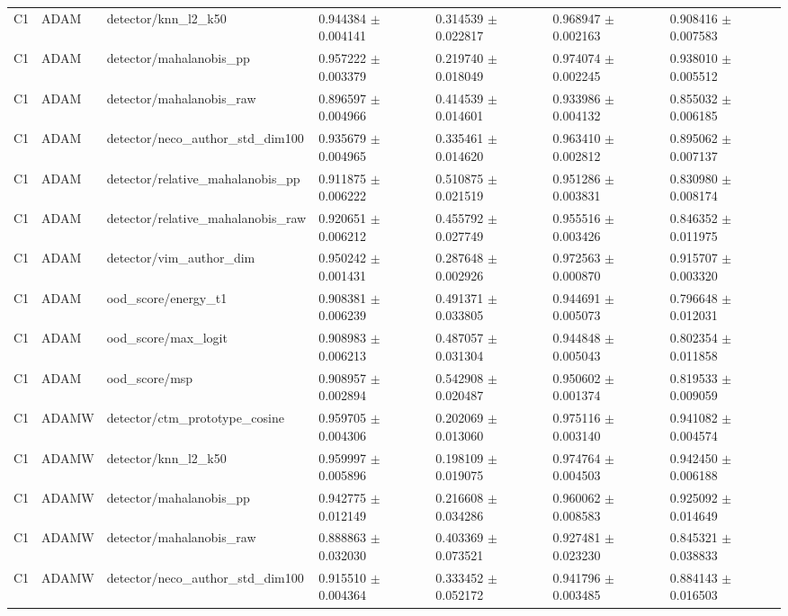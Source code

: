 \begin{longtable}{lllllll}
C1 & ADAM & detector/knn\_l2\_k50 & 0.944384 $\pm$ 0.004141 & 0.314539 $\pm$ 0.022817 & 0.968947 $\pm$ 0.002163 & 0.908416 $\pm$ 0.007583 \\
C1 & ADAM & detector/mahalanobis\_pp & 0.957222 $\pm$ 0.003379 & 0.219740 $\pm$ 0.018049 & 0.974074 $\pm$ 0.002245 & 0.938010 $\pm$ 0.005512 \\
C1 & ADAM & detector/mahalanobis\_raw & 0.896597 $\pm$ 0.004966 & 0.414539 $\pm$ 0.014601 & 0.933986 $\pm$ 0.004132 & 0.855032 $\pm$ 0.006185 \\
C1 & ADAM & detector/neco\_author\_std\_dim100 & 0.935679 $\pm$ 0.004965 & 0.335461 $\pm$ 0.014620 & 0.963410 $\pm$ 0.002812 & 0.895062 $\pm$ 0.007137 \\
C1 & ADAM & detector/relative\_mahalanobis\_pp & 0.911875 $\pm$ 0.006222 & 0.510875 $\pm$ 0.021519 & 0.951286 $\pm$ 0.003831 & 0.830980 $\pm$ 0.008174 \\
C1 & ADAM & detector/relative\_mahalanobis\_raw & 0.920651 $\pm$ 0.006212 & 0.455792 $\pm$ 0.027749 & 0.955516 $\pm$ 0.003426 & 0.846352 $\pm$ 0.011975 \\
C1 & ADAM & detector/vim\_author\_dim & 0.950242 $\pm$ 0.001431 & 0.287648 $\pm$ 0.002926 & 0.972563 $\pm$ 0.000870 & 0.915707 $\pm$ 0.003320 \\
C1 & ADAM & ood\_score/energy\_t1 & 0.908381 $\pm$ 0.006239 & 0.491371 $\pm$ 0.033805 & 0.944691 $\pm$ 0.005073 & 0.796648 $\pm$ 0.012031 \\
C1 & ADAM & ood\_score/max\_logit & 0.908983 $\pm$ 0.006213 & 0.487057 $\pm$ 0.031304 & 0.944848 $\pm$ 0.005043 & 0.802354 $\pm$ 0.011858 \\
C1 & ADAM & ood\_score/msp & 0.908957 $\pm$ 0.002894 & 0.542908 $\pm$ 0.020487 & 0.950602 $\pm$ 0.001374 & 0.819533 $\pm$ 0.009059 \\
C1 & ADAMW & detector/ctm\_prototype\_cosine & 0.959705 $\pm$ 0.004306 & 0.202069 $\pm$ 0.013060 & 0.975116 $\pm$ 0.003140 & 0.941082 $\pm$ 0.004574 \\
C1 & ADAMW & detector/knn\_l2\_k50 & 0.959997 $\pm$ 0.005896 & 0.198109 $\pm$ 0.019075 & 0.974764 $\pm$ 0.004503 & 0.942450 $\pm$ 0.006188 \\
C1 & ADAMW & detector/mahalanobis\_pp & 0.942775 $\pm$ 0.012149 & 0.216608 $\pm$ 0.034286 & 0.960062 $\pm$ 0.008583 & 0.925092 $\pm$ 0.014649 \\
C1 & ADAMW & detector/mahalanobis\_raw & 0.888863 $\pm$ 0.032030 & 0.403369 $\pm$ 0.073521 & 0.927481 $\pm$ 0.023230 & 0.845321 $\pm$ 0.038833 \\
C1 & ADAMW & detector/neco\_author\_std\_dim100 & 0.915510 $\pm$ 0.004364 & 0.333452 $\pm$ 0.052172 & 0.941796 $\pm$ 0.003485 & 0.884143 $\pm$ 0.016503 \\

\end{longtable}
